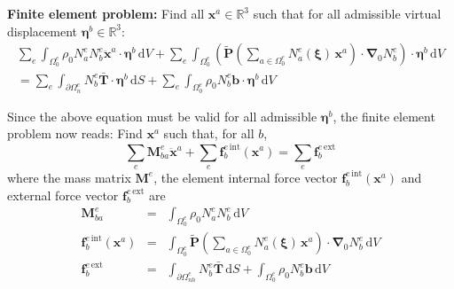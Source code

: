 \documentclass[oneside,11pt,times]{book}
\begin{document}
\textbf{Finite element problem:} Find all $\bm{x}^a \in \mathbb{R}^3$ such that for all admissible virtual displacement $\bm{\eta}^b \in \mathbb{R}^3$:
%
\begin{equation} \label{equationGlobalWeakForm0}
 \begin{split}
 \sum_e \int_{\Omega_{0}^e} \rho_0 N^e_a N^e_b \ddot{\bm{x}}^a \cdot \bm{\eta}^b\, \text{d} V   + \sum_e \int_{\Omega_{0}^e} \left(\tilde{\bm{P}}\left( \sum_{a \in \Omega_{0}^e} N^e_{a}(\bm{\xi})\, \bm{x}^a \right) \cdot  \bm{\nabla}\!_0 N^e_b \right)  \cdot \bm{\eta}^b\, \text{d} V \\ = \sum_e \int_{\partial \Omega_{n}^e} N_b^e \bar{\bm{T}} \cdot \bm{\eta}^b \, \text{d} S + \sum_e \int_{\Omega_{0}^e} \rho_0 N_b^e \bm{b} \cdot \bm{\eta}^b \, \text{d} V
 \end{split}
\end{equation}
%


Since the above equation must be valid for all admissible $\bm{\eta}^b$, the finite element problem now reads: Find $\bm{x}^a$ such that, for all $b$,
%
\begin{equation} \label{equationGlobalWeakForm1}
 \sum_e \bm{M}^{e}_{ba} \ddot{\bm{x}}^a +
 \sum_e \bm{f}_{b}^{e\,\text{int}}(\bm{x}^a) = \sum_e \bm{f}_{b}^{e\,\text{ext}}
\end{equation}
%
where the mass matrix $\bm{M}^{e}$, the element internal force vector $\bm{f}_{b}^{e\,\text{int}}(\bm{x}^a)$ and external force vector $\bm{f}_{b}^{e\,\text{ext}}$ are
%
%
\begin{eqnarray}
 \bm{M}^{e}_{ba} & = & \int_{\Omega_{0}^{e}} \rho_0 N_a^e N_b^e \, \text{d} V    \label{equationElementMassMatrix} \\
 \bm{f}_{b}^{e\,\text{int}}(\bm{x}^a) & = & \int_{\Omega_{0}^e} \tilde{\bm{P}}\left( \sum_{a \in \Omega_{0}^e} N^e_a(\bm{\xi})\, \bm{x}^a \right) \cdot \bm{\nabla}\!_0 N_b^e \,  \text{d} V \label{equationInternalForceVector} \\
 \bm{f}_{b}^{e\,\text{ext}} & = & \int_{\partial \Omega_{nh}^e} N_b^e \bar{\bm{T}} \, \text{d} S +
 \int_{\Omega_{0}^e} \rho_0 N_b^e \bm{b}  \, \text{d} V\label{equationExternalForceVector}
\end{eqnarray}
%
\end{document}
